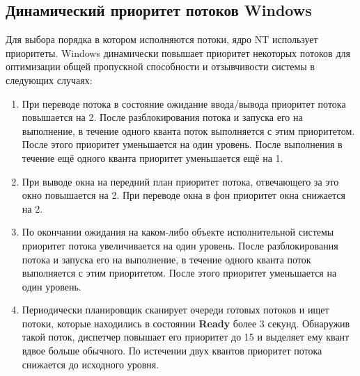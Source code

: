 \documentclass[a4paper]{article}
\begin{document}
\subsection{Динамический приоритет потоков Windows}
Для выбора порядка в котором исполняются потоки, ядро NT использует приоритеты. Windows динамически повышает приоритет некоторых потоков для оптимизации общей пропускной способности и отзывчивости системы в следующих случаях:
\begin{enumerate}
        \item При переводе потока в состояние ожидание ввода/вывода приоритет потока повышается на 2. После разблокирования потока и запуска его на выполнение, в течение одного кванта поток выполняется с этим приоритетом. После этого приоритет уменьшается на один уровень. После выполнения в течение ещё одного кванта приоритет уменьшается ещё на 1.
	\item При выводе окна на передний план приоритет потока, отвечающего за это окно повышается на 2. При переводе окна в фон приоритет окна снижается на 2.
	\item По окончании ожидания на каком-либо объекте исполнительной системы приоритет потока увеличивается на один уровень. После разблокирования потока и запуска его на выполнение, в течение одного кванта поток выполняется с этим приоритетом. После этого приоритет уменьшается на один уровень.
	\item Периодически планировщик сканирует очереди готовых потоков и ищет потоки, которые находились в состоянии \textbf{Ready} более 3 секунд. Обнаружив такой поток, диспетчер повышает его приоритет до 15 и выделяет ему квант вдвое больше обычного. По истечении двух квантов приоритет потока снижается до исходного уровня. 
\end{enumerate}
\end{document}
